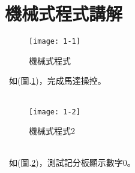 \section{機械式程式講解}
\begin{figure}[hbt!]
\begin{center}
\texttt{[image: 1-1]}
\caption{\Large 機械式程式}\label{機械式程式}
\end{center}
\end{figure}\
如(圖.\ref{機械式程式})，完成馬達操控。\\
\
\begin{figure}[hbt!]
\begin{center}
\texttt{[image: 1-2]}
\caption{\Large 機械式程式2}\label{機械式程式2}
\end{center}
\end{figure}\\
\
如(圖.\ref{機械式程式2})，測試記分板顯示數字0。\